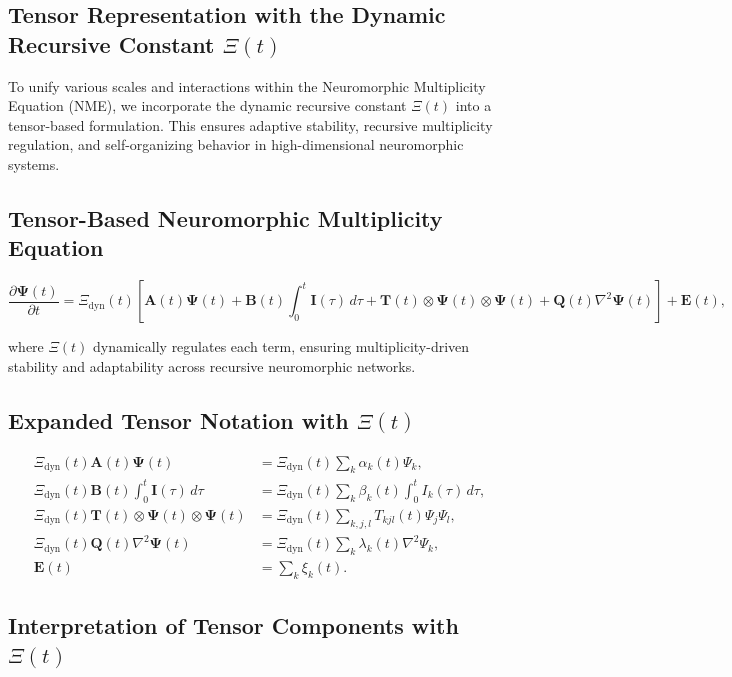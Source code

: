 \documentclass{article}
\theoremstyle{plain}
\begin{document}
\begin{itemize}
\section{Tensor Representation with the Dynamic Recursive Constant \(\Xi(t) \)}

To unify various scales and interactions within the Neuromorphic Multiplicity Equation (NME), we incorporate the dynamic recursive constant \(\Xi(t) \) into a tensor-based formulation. This ensures adaptive stability, recursive multiplicity regulation, and self-organizing behavior in high-dimensional neuromorphic systems.

\subsection{Tensor-Based Neuromorphic Multiplicity Equation}

\begin{equation}
\frac{\partial \bm{\Psi}(t)}{\partial t} = \Xi_{\text{dyn}}(t) \left[ \bm{A}(t) \bm{\Psi}(t) + \bm{B}(t) \int_0^t \bm{I}(\tau) \, d\tau + \bm{T}(t) \otimes \bm{\Psi}(t) \otimes \bm{\Psi}(t) + \bm{Q}(t) \nabla^2 \bm{\Psi}(t) \right] + \bm{E}(t),
\end{equation}

where \(\Xi(t) \) dynamically regulates each term, ensuring multiplicity-driven stability and adaptability across recursive neuromorphic networks.

\subsection{Expanded Tensor Notation with \(\Xi(t) \)}

\begin{align}
\Xi_{\text{dyn}}(t) \bm{A}(t) \bm{\Psi}(t) &= \Xi_{\text{dyn}}(t) \sum_k \alpha_k(t) \Psi_k, \\
\Xi_{\text{dyn}}(t) \bm{B}(t) \int_0^t \bm{I}(\tau) \, d\tau &= \Xi_{\text{dyn}}(t) \sum_k \beta_k(t) \int_0^t I_k(\tau) \, d\tau, \\
\Xi_{\text{dyn}}(t) \bm{T}(t) \otimes \bm{\Psi}(t) \otimes \bm{\Psi}(t) &= \Xi_{\text{dyn}}(t) \sum_{k,j,l} T_{kjl}(t) \Psi_j \Psi_l, \\
\Xi_{\text{dyn}}(t) \bm{Q}(t) \nabla^2 \bm{\Psi}(t) &= \Xi_{\text{dyn}}(t) \sum_k \lambda_k(t) \nabla^2 \Psi_k, \\
\bm{E}(t) &= \sum_k \xi_k(t).
\end{align}

\subsection{Interpretation of Tensor Components with \(\Xi(t) \)}


\end{itemize}
\end{document}
